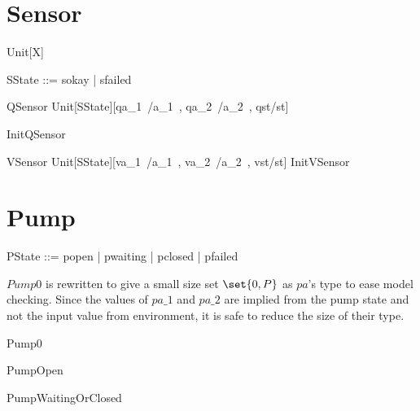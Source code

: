 \documentclass{report} %
\begin{document}
\section{Sensor}

\begin{zed}
[X]
\also  Unit[X] 
\end{zed}

\begin{zed}
  SState ::= sokay | sfailed
\end{zed}

\begin{zed}
  QSensor  Unit[SState][qa\_1~/a\_1~, qa\_2~/a\_2~, qst/st]
\end{zed}

\begin{zed}
  InitQSensor 
\end{zed}

\begin{zed}
  VSensor  Unit[SState][va\_1~/a\_1~, va\_2~/a\_2~, vst/st]
  \also %
  InitVSensor 
\end{zed}

\section{Pump}
\begin{zed}
  PState ::= popen | pwaiting | pclosed | pfailed
\end{zed}

$Pump0$ is rewritten to give a small size set $\set{0, P}$ as $pa$'s type to ease model checking. Since the values of $pa\_1$ and $pa\_2$ are implied from the pump state and not the input value from environment, it is safe to reduce the size of their type.
\begin{zed}
  Pump0 
\end{zed}

\begin{zed}
  PumpOpen 
\end{zed}

\begin{zed}
  PumpWaitingOrClosed 
\end{zed}
\end{document}
